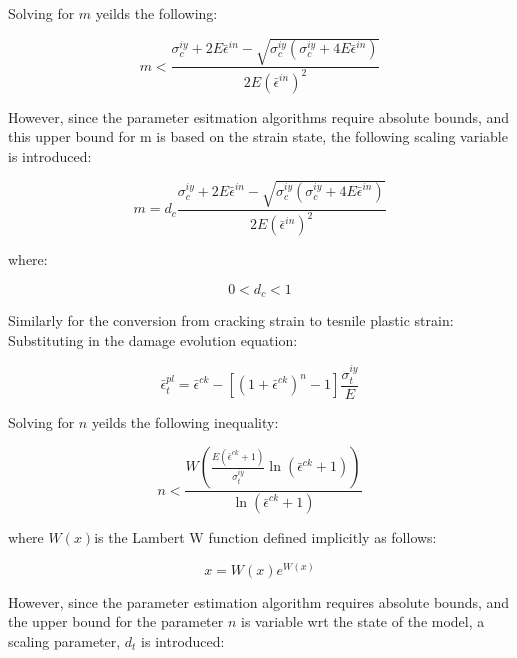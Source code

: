 Solving for $m$ yeilds the following:

\begin{equation}
m<\frac{\sigma_{c}^{iy}+2E\bar{\epsilon}^{in}-\sqrt{\sigma_{c}^{iy}\left(\sigma_{c}^{iy}+4E\bar{\epsilon}^{in}\right)}}{2E\left(\bar{\epsilon}^{in}\right)^{2}}\label{eqn:param13}
\end{equation}


However, since the parameter esitmation algorithms require absolute
bounds, and this upper bound for m is based on the strain state, the
following scaling variable is introduced:

\begin{equation}
m=d_{c}\frac{\sigma_{c}^{iy}+2E\bar{\epsilon}^{in}-\sqrt{\sigma_{c}^{iy}\left(\sigma_{c}^{iy}+4E\bar{\epsilon}^{in}\right)}}{2E\left(\bar{\epsilon}^{in}\right)^{2}}\label{eqn:param14}
\end{equation}


where:

\begin{equation}
0<d_{c}<1\label{eqn:param15}
\end{equation}


Similarly for the conversion from cracking strain to tesnile plastic
strain: Substituting in the damage evolution equation:

\begin{equation}
\bar{\epsilon}_{t}^{pl}=\bar{\epsilon}^{ck}-\left[\left(1+\bar{\epsilon}^{ck}\right)^{n}-1\right]\frac{\sigma_{t}^{iy}}{E}\label{eqn:param5-1}
\end{equation}


Solving for $n$ yeilds the following inequality:

\begin{equation}
n<\frac{W\left(\frac{E\left(\bar{\epsilon}^{ck}+1\right)}{\sigma_{t}^{iy}}\ln\left(\bar{\epsilon}^{ck}+1\right)\right)}{\ln\left(\bar{\epsilon}^{ck}+1\right)}\label{eqn:param7}
\end{equation}


where $W\left(x\right)$is the Lambert W function defined implicitly as follows:

\begin{equation}
x=W\left(x\right)e^{W(x)}\label{eqn:param8}
\end{equation}


However, since the parameter estimation algorithm requires absolute
bounds, and the upper bound for the parameter $n$ is variable wrt
the state of the model, a scaling parameter, $d_{t}$ is introduced:

